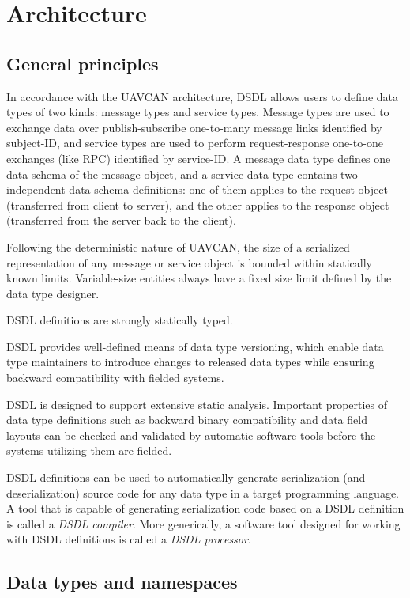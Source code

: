 \section{Architecture}

\subsection{General principles}

In accordance with the UAVCAN architecture, DSDL allows users to define data types of two kinds:
message types and service types.
Message types are used to exchange data over publish-subscribe one-to-many message links identified by subject-ID,
and service types are used to perform request-response one-to-one exchanges (like RPC) identified by service-ID.
A message data type defines one data schema of the message object,
and a service data type contains two independent data schema definitions:
one of them applies to the request object (transferred from client to server),
and the other applies to the response object (transferred from the server back to the client).

Following the deterministic nature of UAVCAN, the size of a serialized representation of any
message or service object is bounded within statically known limits.
Variable-size entities always have a fixed size limit defined by the data type designer.

DSDL definitions are strongly statically typed.

DSDL provides well-defined means of data type versioning, which enable data type maintainers to introduce changes
to released data types while ensuring backward compatibility with fielded systems.

DSDL is designed to support extensive static analysis. Important properties of data type definitions such as
backward binary compatibility and data field layouts can be checked and validated by automatic software tools
before the systems utilizing them are fielded.

DSDL definitions can be used to automatically generate serialization (and deserialization) source code
for any data type in a target programming language.
A tool that is capable of generating serialization code based on a DSDL definition is called a \emph{DSDL compiler}.
More generically, a software tool designed for working with DSDL definitions is called a \emph{DSDL processor}.

\subsection{Data types and namespaces}

